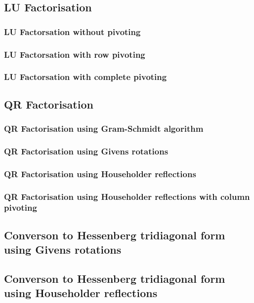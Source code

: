 \subsection{LU Factorisation}

\subsubsection{LU Factorsation without pivoting}
\subsubsection{LU Factorsation with row pivoting}
\subsubsection{LU Factorsation with complete pivoting}

\subsection{QR Factorisation}

\subsubsection{QR Factorisation using Gram-Schmidt algorithm}
\subsubsection{QR Factorisation using Givens rotations}
\subsubsection{QR Factorisation using Householder reflections}
\subsubsection{QR Factorisation using Householder reflections with column pivoting}

\subsection{Converson to Hessenberg tridiagonal form using Givens rotations}
\subsection{Converson to Hessenberg tridiagonal form using Householder reflections}

